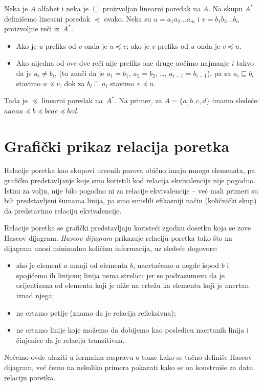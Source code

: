 Neka je $A$ alfabet i neka je $\sqsubseteq$ proizvoljan linearni poredak na $A$. Na skupu $A^*$
defini\v semo linearni poredak $\preccurlyeq$ ovako. Neka su $u = a_1 a_2 \ldots a_m$ i $v = b_1 b_2 \ldots b_n$ proizvoljne
re\v ci iz~$A^*$.
\begin{itemize}
\item
    Ako je $u$ prefiks od $v$ onda je $u \preccurlyeq v$; ako je $v$ prefiks od $u$ onda je $v \preccurlyeq u$.
\item
    Ako nijedna od ove dve re\v ci nije prefiks one druge uo\v cimo najmanje $i$ takvo da je $a_i \ne b_i$,
    (to zna\v ci da je $a_1 = b_1$, $a_2 = b_2$, \ldots, $a_{i-1} = b_{i-1}$), pa za $a_i \sqsubseteq b_i$ stavimo
    $u \preccurlyeq v$, dok za $b_i \sqsubseteq a_i$ stavimo $v \preccurlyeq u$.
\end{itemize}
Tada je $\preccurlyeq$ linearni poredak na~$A^*$.
Na primer, za $A = \{a, b, c, d\}$ imamo slede\'ce: $aaaaa \preccurlyeq b \preccurlyeq bcac \preccurlyeq bcd$.



\section{Grafi\v cki prikaz relacija poretka}


Relacije poretka kao skupovi ure\dj enih parova obi\v cno imaju mnogo elemenata, pa grafi\v cko predstavljanje koje smo
koristili kod relacija ekvivalencije nije pogodno. Istini za volju, nije bilo pogodno ni za relacije ekvivalencije --
ve\'c mali primeri su bili predstavljeni \v sumama linija, pa smo smislili efikasniji na\v cin (koli\v cni\v cki skup)
da predstavimo relaciju ekvivalencije.

Relacije poretka se grafi\v cki predstavljaju koriste\'ci zgodnu dosetku koja se zove Haseov dijagram.
\emph{Haseov dijagram} prikazuje relaciju poretka tako \v sto na dijagram unosi minimalnu
koli\v cinu informacija, uz slede\'ce dogovore:
\begin{itemize}
  \item ako je element $a$ manji od elementa $b$, nacrta\'cemo $a$ negde ispod $b$ i spoji\'cemo ih linijom;
        linija nema strelicu jer se podrazumeva da je orijentisana od elementa koji je ni\v ze na crte\v zu
        ka elementu koji je nacrtan iznad njega;
  \item ne crtamo petlje (znamo da je relacija refleksivna);
  \item ne crtamo linije koje mo\v zemo da dobijemo kao posledicu nacrtanih linija i \v cinjenice da je relacija tranzitivna.
\end{itemize}
Ne\'cemo ovde ulaziti u formalnu raspravu o tome kako se ta\v cno defini\v se Haseov dijagram,
ve\'c \'cemo na nekoliko primera pokazati kako se on konstrui\v se za datu relaciju poretka.

